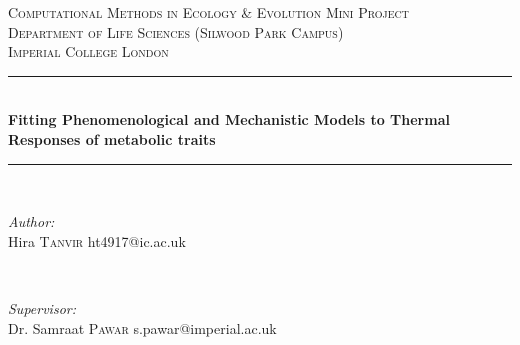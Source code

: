 \begin{titlepage}


\newcommand{\HRule}{\rule{\linewidth}{0.5mm}} %

\centering %
 

\textsc{\Large Computational Methods in Ecology \& Evolution Mini Project}\\[0.5cm] %
\textsc{\large Department of Life Sciences (Silwood Park Campus) \protect\\ Imperial College London }\\[0.5cm] %

\HRule \\[0.4cm]
{ \Large \bfseries Fitting Phenomenological and Mechanistic Models to Thermal Responses of metabolic traits}\\[0.4cm] %
\HRule \\[1.0cm]

 

\begin{minipage}{0.4\textwidth}
\begin{flushleft} \large
\emph{Author:}\\
Hira \textsc{Tanvir} %
ht4917@ic.ac.uk
\end{flushleft}
\end{minipage}
~
\begin{minipage}{0.4\textwidth}
\begin{flushright} \large
\emph{Supervisor:} \\
Dr. Samraat \textsc{Pawar} %
s.pawar@imperial.ac.uk
\end{flushright}
\end{minipage}\\[2cm]


\end{titlepage}
